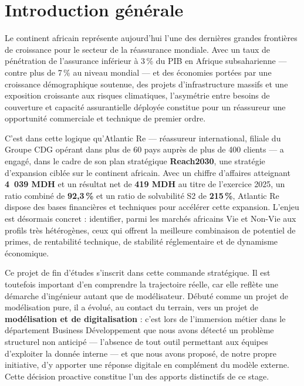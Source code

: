\documentclass[../main.tex]{subfiles}
\begin{document}
\chapter*{Introduction générale}

Le continent africain représente aujourd'hui l'une des dernières grandes frontières
de croissance pour le secteur de la réassurance mondiale. Avec un taux de pénétration
de l'assurance inférieur à 3\,\% du PIB en Afrique subsaharienne --- contre plus de
7\,\% au niveau mondial \citep{SwissRe2023} --- et des économies portées par une
croissance démographique soutenue, des projets d'infrastructure massifs et une
exposition croissante aux risques climatiques, l'asymétrie entre besoins de couverture
et capacité assurantielle déployée constitue pour un réassureur une opportunité
commerciale et technique de premier ordre.

C'est dans cette logique qu'Atlantic Re --- réassureur international, filiale du
Groupe CDG opérant dans plus de 60 pays auprès de plus de 400 clients --- a engagé,
dans le cadre de son plan stratégique \textbf{Reach2030}, une stratégie d'expansion
ciblée sur le continent africain. Avec un chiffre d'affaires atteignant
\textbf{4~039 MDH} et un résultat net de \textbf{419 MDH} au titre de l'exercice
2025, un ratio combiné de \textbf{92,3\,\%} et un ratio de solvabilité S2 de
\textbf{215\,\%}, Atlantic Re dispose des bases financières et techniques pour
accélérer cette expansion. L'enjeu est désormais concret : identifier, parmi les
marchés africains Vie et Non-Vie aux profils très hétérogènes, ceux qui offrent la
meilleure combinaison de potentiel de primes, de rentabilité technique, de stabilité
réglementaire et de dynamisme économique.

Ce projet de fin d'études s'inscrit dans cette commande stratégique. Il est toutefois
important d'en comprendre la trajectoire réelle, car elle reflète une démarche
d'ingénieur autant que de modélisateur. Débuté comme un projet de modélisation pure,
il a évolué, au contact du terrain, vers un projet de \textbf{modélisation et de
digitalisation} : c'est lors de l'immersion métier dans le département Business
Développement que nous avons détecté un problème structurel non anticipé --- l'absence
de tout outil permettant aux équipes d'exploiter la donnée interne --- et que nous
avons proposé, de notre propre initiative, d'y apporter une réponse digitale en
complément du modèle externe. Cette décision proactive constitue l'un des apports
distinctifs de ce stage.
\end{document}
